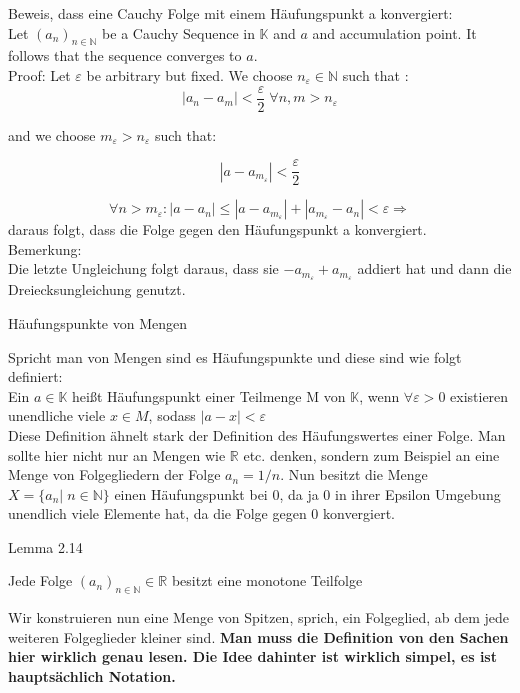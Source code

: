 \documentclass[headsepline,12pt,a4paper]{scrartcl}
\begin{document}
\item Beweis, dass eine Cauchy Folge mit einem Häufungspunkt a konvergiert: \\

Let $(a_n)_{n\in \mathbb{N}}$ be a Cauchy Sequence in $\mathbb{K}$ and $a$ and accumulation point. It follows that the sequence converges to $a$. \\

Proof: Let $\varepsilon$ be arbitrary but fixed. We choose
$n_\varepsilon \in \mathbb{N} $ such that :
$$ |a_n- a_m| < \frac{\varepsilon}{2} \; \forall n,m > n_\varepsilon
$$ 
 
 and we choose $m_\varepsilon > n_\varepsilon $ such that:
 
 $$|a-a_{m_\varepsilon}| < \frac{\varepsilon}{2} $$
 
 $$ \forall n > m_\varepsilon : |a-a_n| \leq |a-a_{m_\varepsilon}| 
   + |a_{m_\varepsilon} - a_n| < \varepsilon \Rightarrow $$ daraus folgt, dass die Folge gegen den Häufungspunkt a konvergiert. \\
   
Bemerkung: \\ Die letzte Ungleichung folgt daraus, dass sie $-a_{m_\varepsilon} + a_{m_\varepsilon} $ addiert hat und dann die Dreiecksungleichung genutzt. 

\begin{center}
\item[Häufungspunkte von Mengen]
\end{center}
\item Spricht man von Mengen sind es Häufungspunkte und diese sind wie folgt definiert: \\

Ein $a\in \mathbb{K} $ heißt Häufungspunkt einer Teilmenge M von $\mathbb{K}$, wenn $\forall \varepsilon > 0 $ existieren unendliche viele $ x \in M $, sodass $|a-x| < \varepsilon $ \\

Diese Definition ähnelt stark der Definition des Häufungswertes einer Folge. Man sollte hier nicht nur an Mengen wie $\mathbb{R}$ etc. denken, sondern zum Beispiel an eine Menge von Folgegliedern der Folge $ a_n = 1/n $. Nun besitzt die Menge $ X = \{ a_n | \; n \in \mathbb{N} \} $ einen Häufungspunkt bei 0, da ja 0 in ihrer Epsilon Umgebung unendlich viele Elemente hat, da die Folge gegen 0 konvergiert.

\begin{center}
\item[Lemma 2.14]
\end{center}
\item Jede Folge $(a_n)_{n\in \mathbb{N}} \in \mathbb{R} $ besitzt eine monotone Teilfolge 
\item Wir konstruieren nun eine Menge von Spitzen, sprich, ein Folgeglied, ab dem jede weiteren Folgeglieder kleiner sind. \textbf{Man muss die Definition von den Sachen hier wirklich genau lesen. Die Idee dahinter ist wirklich simpel, es ist hauptsächlich Notation.}\\
\end{document}
